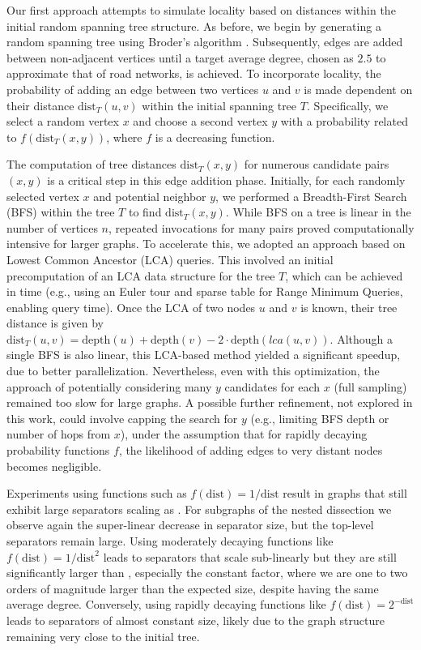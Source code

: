 Our first approach attempts to simulate locality based on distances within the initial random spanning tree structure.
As before, we begin by generating a random spanning tree using Broder's algorithm \cite{broder_generating_1989}.
Subsequently, edges are added between non-adjacent vertices until a target average degree, chosen as \(2.5\) to approximate that of road networks, is achieved.
To incorporate locality, the probability of adding an edge between two vertices \(u\) and \(v\) is made dependent on their distance \( \text{dist}_T(u, v) \) within the initial spanning tree \(T\).
Specifically, we select a random vertex \(x\) and choose a second vertex \(y\) with a probability related to \(f(\text{dist}_T(x, y))\), where \(f\) is a decreasing function.

The computation of tree distances \(\text{dist}_T(x, y)\) for numerous candidate pairs \((x,y)\) is a critical step in this edge addition phase.
Initially, for each randomly selected vertex \(x\) and potential neighbor \(y\), we performed a Breadth-First Search (BFS) within the tree \(T\) to find \(\text{dist}_T(x, y)\).
While BFS on a tree is linear in the number of vertices \(n\), repeated invocations for many pairs proved computationally intensive for larger graphs.
To accelerate this, we adopted an approach based on Lowest Common Ancestor (LCA) queries.
This involved an initial precomputation of an LCA data structure for the tree \(T\), which can be achieved in  time (e.g., using an Euler tour and sparse table for Range Minimum Queries, enabling  query time).
Once the LCA of two nodes \(u\) and \(v\) is known, their tree distance is given by \(\text{dist}_T(u, v) = \text{depth}(u) + \text{depth}(v) - 2 \cdot \text{depth}(lca(u,v))\).
Although a single BFS is also linear, this LCA-based method yielded a significant speedup, due to better parallelization.
Nevertheless, even with this optimization, the approach of potentially considering many \(y\) candidates for each \(x\) (full sampling) remained too slow for large graphs.
A possible further refinement, not explored in this work, could involve capping the search for \(y\) (e.g., limiting BFS depth or number of hops from \(x\)), under the assumption that for rapidly decaying probability functions \(f\), the likelihood of adding edges to very distant nodes becomes negligible.

Experiments using functions such as \( f(\text{dist}) = 1/\text{dist} \) result in graphs that still exhibit large separators scaling as .
For subgraphs of the nested dissection we observe again the super-linear decrease in separator size, but the top-level separators remain large.
Using moderately decaying functions like \( f(\text{dist}) = 1/\text{dist}^2 \) leads to separators that scale sub-linearly but they are still significantly larger than , especially the constant factor, where we are one to two orders of magnitude larger than the expected size, despite having the same average degree.
Conversely, using rapidly decaying functions like \( f(\text{dist}) = 2^{-\text{dist}} \) leads to separators of almost constant size, likely due to the graph structure remaining very close to the initial tree.

